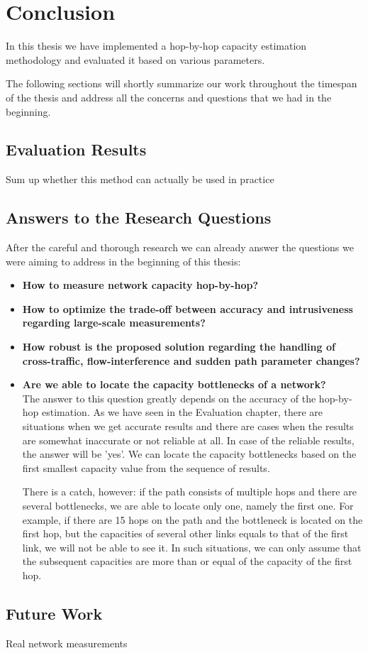 \chapter{Conclusion}
In this thesis we have implemented a hop-by-hop capacity estimation methodology and evaluated it based on various parameters. 

The following sections will shortly summarize our work throughout the timespan of the thesis and address all the concerns and questions that we had in the beginning.

\section{Evaluation Results}
Sum up whether this method can actually be used in practice\\

\section{Answers to the Research Questions}
After the careful and thorough research we can already answer the questions we were aiming to address in the beginning of this thesis: \\
\begin{itemize}
  \item \textbf{How to measure network capacity hop-by-hop?}
  \\ 
  \item \textbf{How to optimize the trade-off between accuracy and intrusiveness regarding large-scale measurements?}
  \\
  \item \textbf{How robust is the proposed solution regarding the handling of cross-traffic, flow-interference and sudden path parameter changes?}
  \\
  \item \textbf{Are we able to locate the capacity bottlenecks of a network?}
  \\ The answer to this question greatly depends on the accuracy of the hop-by-hop estimation. As we have seen in the Evaluation chapter, there are situations when we get accurate results and there are cases when the results are somewhat inaccurate or not reliable at all. In case of the reliable results, the answer will be 'yes'. We can locate the capacity bottlenecks based on the first smallest capacity value from the sequence of results. 
  
  There is a catch, however: if the path consists of multiple hops and there are several bottlenecks, we are able to locate only one, namely the first one. For example, if there are 15 hops on the path and the bottleneck is located on the first hop, but the capacities of several other links equals to that of the first link, we will not be able to see it. In such situations, we can only assume that the subsequent capacities are more than or equal of the capacity of the first hop.
\end{itemize}

\section{Future Work}
Real network measurements